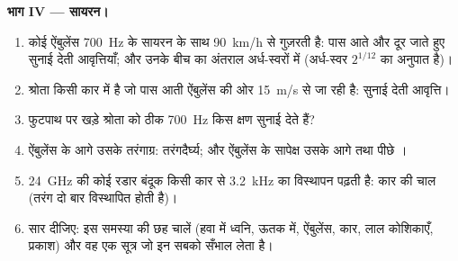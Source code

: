 \begin{problem}
\medskip
\noindent\textbf{भाग IV --- सायरन।}
\begin{enumerate}[resume]
  \item कोई ऐंबुलेंस \qty{700}{Hz} के सायरन के साथ \qty{90}{km/h} से गुज़रती है:
        पास आते और दूर जाते हुए सुनाई देती आवृत्तियाँ; और उनके बीच का
        अंतराल अर्ध-स्वरों में (अर्ध-स्वर $2^{1/12}$ का अनुपात है)।
  \item श्रोता किसी कार में है जो पास आती ऐंबुलेंस की ओर \qty{15}{m/s} से
        जा रही है: सुनाई देती आवृत्ति।
  \item फुटपाथ पर खड़े श्रोता को ठीक \qty{700}{Hz} किस क्षण सुनाई देते हैं?
  \item ऐंबुलेंस के आगे उसके तरंगाग्र: तरंगदैर्घ्य; और ऐंबुलेंस के सापेक्ष
        उसके आगे तथा पीछे ।
  \item \qty{24}{GHz} की कोई रडार बंदूक किसी कार से \qty{3.2}{kHz} का विस्थापन पढ़ती है:
        कार की चाल (तरंग दो बार विस्थापित होती है)।
  \item सार दीजिए: इस समस्या की छह चालें (हवा में ध्वनि,
        ऊतक में, ऐंबुलेंस, कार, लाल कोशिकाएँ, प्रकाश) और वह
        एक सूत्र जो इन सबको सँभाल लेता है।
\end{enumerate}
\end{problem}
